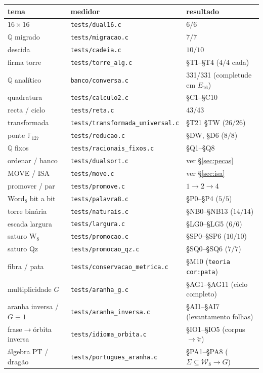 \documentclass[11pt,a4paper]{article}
\newcommand{\code}[1]{\texttt{\small #1}}
\newcommand{\Q}{\ensuremath{\mathbb{Q}}}
\newcommand{\Word}{\mathcal{W}}
\begin{document}
\begin{center}\small
\begin{tabular}{@{}lll@{}}
\toprule
tema & medidor & resultado \\
\midrule
$16\times16$ & \code{tests/dual16.c} & $6/6$ \\
$\Q$ migrado & \code{tests/migracao.c} & $7/7$ \\
descida & \code{tests/cadeia.c} & $10/10$ \\
firma torre & \code{tests/torre\_alg.c} & §T1--§T4 ($4/4$ cada) \\
$\Q$ analítico & \code{banco/conversa.c} & 331/331 (completude em $E_{16}$) \\
quadratura & \code{tests/calculo2.c} & §C1--§C10 \\
recta / ciclo & \code{tests/reta.c} & $43/43$ \\
transformada & \code{tests/transformada\_universal.c} & §T21 §TW ($26/26$) \\
ponte $\mathbb{F}_{127}$ & \code{tests/reducao.c} & §DW, §D6 ($8/8$) \\
$\Q$ fixos & \code{tests/racionais\_fixos.c} & §Q1--§Q8 \\
ordenar / banco & \code{tests/dualsort.c} & ver §\ref{sec:pecas} \\
MOVE / ISA & \code{tests/move.c} & ver §\ref{sec:isa} \\
promover / par & \code{tests/promove.c} & $1\to2\to4$ \\
Word$_8$ bit a bit & \code{tests/palavra8.c} & §P0--§P4 ($5/5$) \\
torre binária & \code{tests/naturais.c} & §NB0--§NB13 ($14/14$) \\
escada largura & \code{tests/largura.c} & §LG0--§LG5 ($6/6$) \\
saturo W$_8$ & \code{tests/promocao.c} & §SP0--§SP6 ($10/10$) \\
saturo Qz & \code{tests/promocao\_qz.c} & §SQ0--§SQ6 ($7/7$) \\
fibra / pata & \code{tests/conservacao\_metrica.c} & §M10 (\code{teoria cor:pata}) \\
multiplicidade $G$ & \code{tests/aranha\_g.c} & §AG1--§AG11 (ciclo completo) \\
aranha inversa / $G\equiv1$ & \code{tests/aranha\_inversa.c} & §AI1--§AI7 (levantamento folhas) \\
frase$\to$órbita inversa & \code{tests/idioma\_orbita.c} & §IO1--§IO5 (corpus$\to\tilde\pi$) \\
álgebra PT / dragão & \code{tests/portugues\_aranha.c} & §PA1--§PA8 ($\Sigma\subseteq\Word_8\to G$) \\

\end{tabular}
\end{center}
\end{document}
